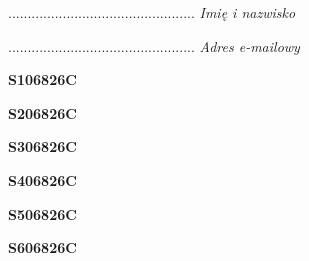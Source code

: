 \begin{turn}{90}\begin{minipage}{\linewidth} \vspace{20mm} ................................................  \textit{Imię i nazwisko}\end{minipage}\end{turn}

\begin{turn}{90}\begin{minipage}{\linewidth} \vspace{20mm} ................................................  \textit{Adres e-mailowy}\end{minipage}\end{turn}

\begin{turn}{90}\huge \begin{minipage}{\linewidth} \vspace{10mm}\textbf{S106826C}\end{minipage}\end{turn}

\begin{turn}{90}\huge \begin{minipage}{\linewidth} \vspace{10mm}\textbf{S206826C}\end{minipage}\end{turn}

\begin{turn}{90}\huge \begin{minipage}{\linewidth} \vspace{10mm}\textbf{S306826C}\end{minipage}\end{turn}

\begin{turn}{90}\huge \begin{minipage}{\linewidth} \vspace{10mm}\textbf{S406826C}\end{minipage}\end{turn}

\begin{turn}{90}\huge \begin{minipage}{\linewidth} \vspace{10mm}\textbf{S506826C}\end{minipage}\end{turn}

\begin{turn}{90}\huge \begin{minipage}{\linewidth} \vspace{10mm}\textbf{S606826C}\end{minipage}\end{turn}

